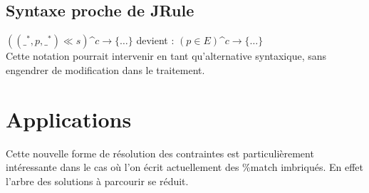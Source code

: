 \documentclass{article}
\newcommand{\filter}{\ll}
\begin{document}
\subsection{Syntaxe proche de JRule}
$((\_^*,p,\_^*)\filter s)$\textasciicircum$c\rightarrow\{\dots\}$ devient : $(p\in E)$\textasciicircum$c\rightarrow\{\dots\}$
\\

Cette notation pourrait intervenir en tant qu'alternative syntaxique, sans engendrer de modification dans le traitement.

\section{Applications}

Cette nouvelle forme de r\'esolution des contraintes est particuli\`erement int\'eressante dans le cas o\`u l'on \'ecrit actuellement des \%match imbriqu\'es. En effet l'arbre des solutions \`a parcourir se r\'eduit.
\end{document}
